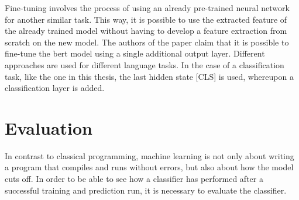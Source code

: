 \documentclass[a4paper, 11pt,titlepage,oneside,openany]{book}
\begin{document}
Fine-tuning involves the process of using an already pre-trained neural network for another similar task. This way, it is possible to use the extracted feature of the already trained model without having to develop a feature extraction from scratch on the new model. The authors of the paper claim that it is possible to fine-tune the \gls{bert} model using a single additional output layer. Different approaches are used for different language tasks. In the case of a classification task, like the one in this thesis, the last hidden state [CLS] is used, whereupon a classification layer is added. 






\section{Evaluation}
In contrast to classical programming, machine learning is not only about writing a program that compiles and runs without errors, but also about how the model cuts off. In order to be able to see how a classifier has performed after a successful training and prediction run, it is necessary to evaluate the classifier.
\newpage
\end{document}

